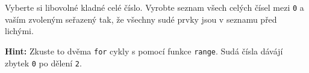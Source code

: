 \question[50]
Vyberte si libovolné kladné celé číslo. Vyrobte seznam všech celých čísel mezi
\texttt{0} a vaším zvoleným seřazený tak, že všechny sudé prvky jsou v seznamu
před lichými.

\textbf{Hint:} Zkuste to dvěma \texttt{for} cykly s pomocí funkce
\texttt{range}. Sudá čísla dávájí zbytek \texttt{0} po dělení \texttt{2}.